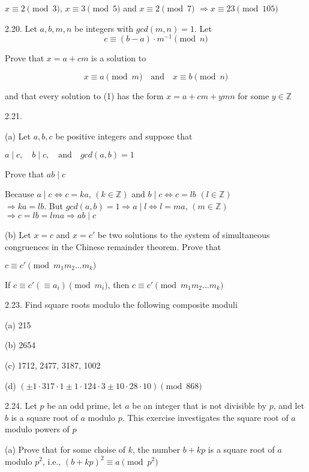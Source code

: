 $x \equiv 2 \pmod 3$, $x \equiv 3 \pmod 5$ and $x \equiv 2 \pmod 7$ $\Rightarrow x \equiv 23 \pmod {105}$


2.20. Let $a,b,m,n$ be integers with $gcd(m,n)=1$. Let
    \[c \equiv (b-a) \cdot m^{-1} \pmod n\]

Prove that $x=a+cm$ is a solution to

\begin{equation*}
    x \equiv a \pmod m \quad \text{and} \quad x\equiv b \pmod n
\end{equation*}

and that every solution to (1) has the form $x=a+cm+ymn$ for some $y \in \mathbb{Z}$

2.21.

(a) Let $a,b,c$ be positive integers and suppose that \begin{center}$a \mid c, \quad b \mid c, \quad \text{and} \quad gcd(a,b)=1$\end{center} Prove that $ab \mid c$
    
    Because $a \mid c \Leftrightarrow c=ka$, $(k \in \mathbb{Z})$ and $b \mid c \Leftrightarrow c=lb$ $(l \in \mathbb{Z})$ \\ $\Rightarrow ka = lb$. But $gcd(a,b)=1 \Rightarrow a \mid l \Leftrightarrow l = ma$, $(m \in \mathbb{Z})$ \\ $\Rightarrow c=lb=lma  \Rightarrow ab \mid c$

(b) Let $x=c$ and $x=c'$ be two solutions to the system of simultaneous congruences in the Chinese remainder theorem. Prove that \begin{center}$c \equiv c' \pmod{m_1m_2...m_k}$\end{center}
    If $c \equiv c' (\equiv a_i) \pmod m_i$, then $c \equiv c' \pmod{m_1m_2...m_k}$

2.23. Find square roots modulo the following composite moduli

(a) 215

(b) 2654

(c) 1712, 2477, 3187, 1002

(d) $(\pm 1 \cdot 317 \cdot 1 \pm 1 \cdot 124 \cdot 3 \pm 10 \cdot 28 \cdot 10) \pmod{868}$


2.24. Let $p$ be an odd prime, let $a$ be an integer that is not divisible by $p$, and let $b$ is a square root of $a$ modulo $p$. This exercise investigates the square root of $a$ modulo powers of $p$

(a) Prove that for some choise of $k$, the number $b+kp$ is a square root of $a$ modulo $p^2$, i.e., $(b+kp)^2 \equiv a \pmod{p^2}$


